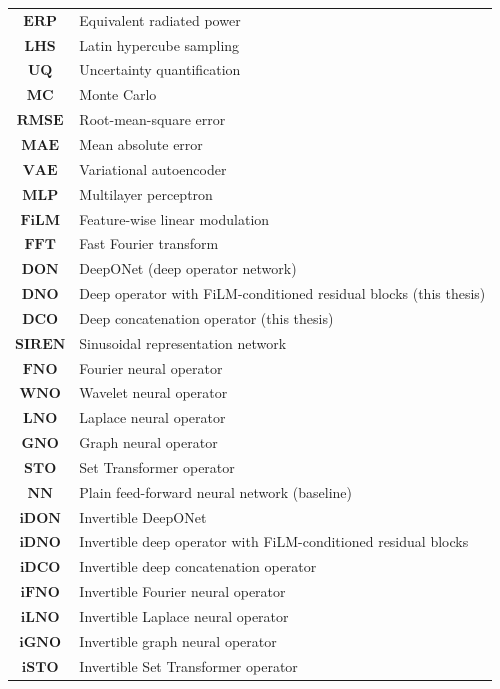 \begin{tabular}{cp{}}
$\textbf{ERP}$   & Equivalent radiated power \\
$\textbf{LHS}$   & Latin hypercube sampling \\
$\textbf{UQ}$    & Uncertainty quantification \\
$\textbf{MC}$    & Monte Carlo \\
$\textbf{RMSE}$  & Root-mean-square error \\
$\textbf{MAE}$   & Mean absolute error \\
$\textbf{VAE}$   & Variational autoencoder \\
$\textbf{MLP}$   & Multilayer perceptron \\
$\textbf{FiLM}$  & Feature-wise linear modulation \\
$\textbf{FFT}$   & Fast Fourier transform \\
$\textbf{DON}$   & DeepONet (deep operator network) \\
$\textbf{DNO}$   & Deep operator with FiLM-conditioned residual blocks (this thesis) \\
$\textbf{DCO}$   & Deep concatenation operator (this thesis) \\
$\textbf{SIREN}$ & Sinusoidal representation network \\
$\textbf{FNO}$   & Fourier neural operator \\
$\textbf{WNO}$   & Wavelet neural operator \\
$\textbf{LNO}$   & Laplace neural operator \\
$\textbf{GNO}$   & Graph neural operator \\
$\textbf{STO}$   & Set Transformer operator \\
$\textbf{NN}$    & Plain feed-forward neural network (baseline) \\
$\textbf{iDON}$  & Invertible DeepONet \\
$\textbf{iDNO}$  & Invertible deep operator with FiLM-conditioned residual blocks \\
$\textbf{iDCO}$  & Invertible deep concatenation operator \\
$\textbf{iFNO}$  & Invertible Fourier neural operator \\
$\textbf{iLNO}$  & Invertible Laplace neural operator \\
$\textbf{iGNO}$  & Invertible graph neural operator \\
$\textbf{iSTO}$  & Invertible Set Transformer operator \\
\end{tabular}
\newpage
